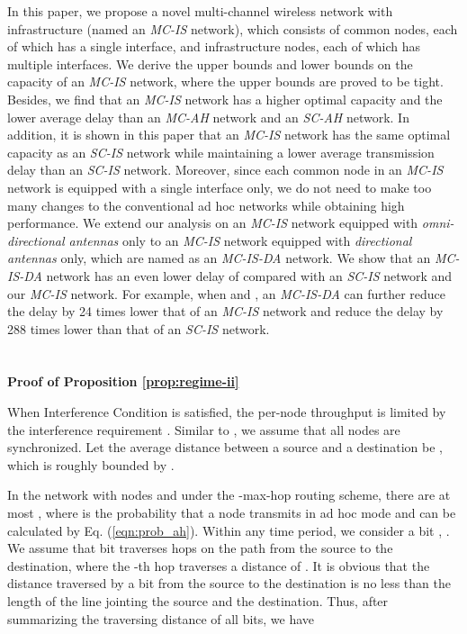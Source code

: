 \documentclass[10pt,journal]{IEEEtran}
\begin{document}
In this paper, we propose a novel multi-channel wireless network with infrastructure (named an \textit{MC-IS} network), which consists of common nodes, each of which has a single interface, and infrastructure nodes, each of which has multiple interfaces. We derive the upper bounds and lower bounds on the capacity of an \textit{MC-IS} network, where the upper bounds are proved to be tight. Besides, we find that an \textit{MC-IS} network has a higher optimal capacity and the lower average delay than an \textit{MC-AH} network and an \textit{SC-AH} network. In addition, it is shown in this paper that an \textit{MC-IS} network has the same optimal capacity as an \textit{SC-IS} network while maintaining a lower average transmission delay than an \textit{SC-IS} network. Moreover, since each common node in an \textit{MC-IS} network is equipped with a single interface only, we do not need to make too many changes to the conventional ad hoc networks while obtaining high performance. We extend our analysis on an \emph{MC-IS} network equipped with \emph{omni-directional antennas} only to an \emph{MC-IS} network equipped with \emph{directional antennas} only, which are named as an \emph{MC-IS-DA} network. We show that an \emph{MC-IS-DA} network has an even lower delay of  compared with an \emph{SC-IS} network and our \emph{MC-IS} network. For example, when  and , an \emph{MC-IS-DA} can further reduce the delay by 24 times lower that of an \emph{MC-IS} network and reduce the delay by 288 times lower than that of an \emph{SC-IS} network.


\appendices
\section{}
\textbf{Proof of Proposition \ref{prop:regime-ii}}

When Interference Condition is satisfied, the per-node throughput is limited by the interference requirement \cite{Gupta:Kumar}. Similar to \cite{Gupta:Kumar}, we assume that all nodes are synchronized. Let the average distance between a source and a destination be , which is roughly bounded by . 

In the network with  nodes and under the -max-hop routing scheme, there are at most , where  is the probability that a node transmits in ad hoc mode and can be calculated by Eq. (\ref{eqn:prob_ah}). Within any time period, we consider a bit , . We assume that bit  traverses  hops on the path from the source to the destination, where the -th hop traverses a distance of . It is obvious that the distance traversed by a bit from the source to the destination is no less than the length of the line jointing the source and the destination. Thus, after summarizing the traversing distance of all bits, we have
\end{document}
